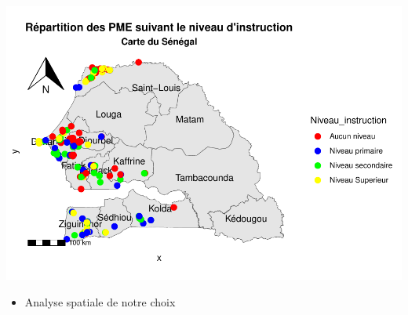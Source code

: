 \documentclass[
]{article}
\providecommand{\tightlist}{%
  \setlength{\itemsep}{0pt}\setlength{\parskip}{0pt}}
\begin{document}
\includegraphics{RMarkdown_files/figure-latex/unnamed-chunk-19-1.pdf}

\begin{itemize}
\tightlist
\item
  Analyse spatiale de notre choix
\end{itemize}
\end{document}
